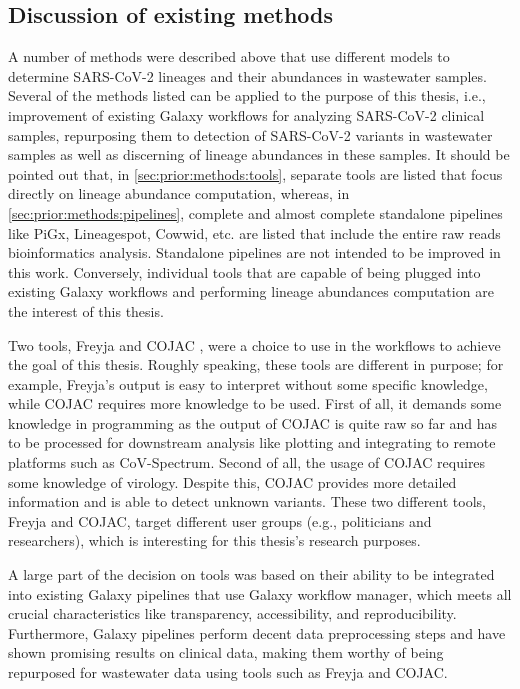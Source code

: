     \subsection{Discussion of existing methods} \label{sec:prior:discussion}
    A number of methods were described above that use different models to determine SARS-CoV-2 lineages and their abundances in wastewater samples. Several of the methods listed can be applied to the purpose of this thesis, i.e., improvement of existing Galaxy workflows for analyzing SARS-CoV-2 clinical samples, repurposing them to detection of SARS-CoV-2 variants in wastewater samples as well as discerning of lineage abundances in these samples. It should be pointed out that, in \cref{sec:prior:methods:tools}, separate tools are listed that focus directly on lineage abundance computation, whereas, in \cref{sec:prior:methods:pipelines}, complete and almost complete standalone pipelines like PiGx, Lineagespot, Cowwid, etc. are listed that include the entire raw reads bioinformatics analysis. Standalone pipelines are not intended to be improved in this work. Conversely, individual tools that are capable of being plugged into existing Galaxy workflows and performing lineage abundances computation are the interest of this thesis.

    Two tools, Freyja \cite{joshuailevy2022,karthikeyan2022} and COJAC \cite{jahn2021}, were a choice to use in the workflows to achieve the goal of this thesis. Roughly speaking, these tools are different in purpose; for example, Freyja’s output is easy to interpret without some specific knowledge, while COJAC requires more knowledge to be used. First of all, it demands some knowledge in programming as the output of COJAC is quite raw so far and has to be processed for downstream analysis like plotting and integrating to remote platforms such as CoV-Spectrum. Second of all, the usage of COJAC requires some knowledge of virology. Despite this, COJAC provides more detailed information and is able to detect unknown variants. These two different tools, Freyja and COJAC, target different user groups (e.g., politicians and researchers), which is interesting for this thesis's research purposes.
    
    A large part of the decision on tools was based on their ability to be integrated into existing Galaxy pipelines that use Galaxy workflow manager, which meets all crucial characteristics like transparency, accessibility, and reproducibility. Furthermore, Galaxy pipelines perform decent data preprocessing steps and have shown promising results on clinical data, making them worthy of being repurposed for wastewater data using tools such as Freyja and COJAC.